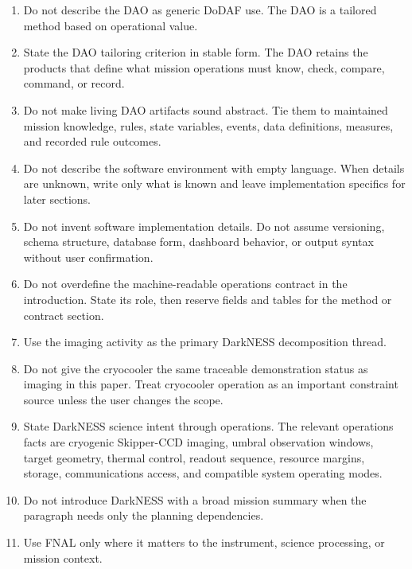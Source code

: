 \documentclass[11pt]{article}
\begin{document}
\begin{enumerate}
\item Do not describe the DAO as generic DoDAF use. The DAO is a tailored method based on operational value.

\item State the DAO tailoring criterion in stable form. The DAO retains the products that define what mission operations must know, check, compare, command, or record.

\item Do not make living DAO artifacts sound abstract. Tie them to maintained mission knowledge, rules, state variables, events, data definitions, measures, and recorded rule outcomes.

\item Do not describe the software environment with empty language. When details are unknown, write only what is known and leave implementation specifics for later sections.

\item Do not invent software implementation details. Do not assume versioning, schema structure, database form, dashboard behavior, or output syntax without user confirmation.

\item Do not overdefine the machine-readable operations contract in the introduction. State its role, then reserve fields and tables for the method or contract section.

\item Use the imaging activity as the primary DarkNESS decomposition thread.

\item Do not give the cryocooler the same traceable demonstration status as imaging in this paper. Treat cryocooler operation as an important constraint source unless the user changes the scope.

\item State DarkNESS science intent through operations. The relevant operations facts are cryogenic Skipper-CCD imaging, umbral observation windows, target geometry, thermal control, readout sequence, resource margins, storage, communications access, and compatible system operating modes.

\item Do not introduce DarkNESS with a broad mission summary when the paragraph needs only the planning dependencies.

\item Use FNAL only where it matters to the instrument, science processing, or mission context.


\end{enumerate}
\end{document}

